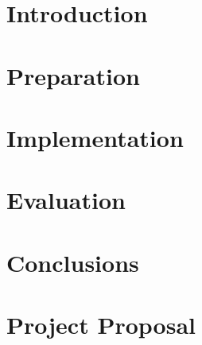 \documentclass[12pt,a4paper,twoside,openright]{report}
\begin{document}



\chapter{Introduction}


\chapter{Preparation}


\chapter{Implementation}


\chapter{Evaluation}


\chapter{Conclusions}



\newpage

\printbibliography


\appendix


\chapter{Project Proposal}



\end{document}
